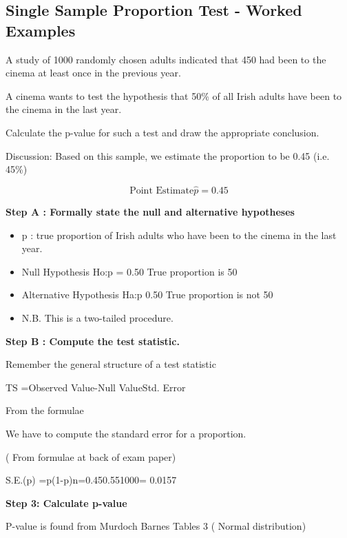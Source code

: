 
\subsection{ Single Sample Proportion Test - Worked Examples}

A study of 1000 randomly chosen adults indicated that 450 had been to the cinema at least once in the previous year.

A cinema wants to test the hypothesis that 50\% of all Irish adults have been to the cinema in the last year.

Calculate the p-value for such a test and draw the appropriate conclusion.

Discussion: Based on this sample, we estimate the proportion to be 0.45  (i.e. 45\%)

\[ \mbox{Point Estimate} \hat{p} = 0.45\]

\noindent \textbf{Step A : Formally state the null and alternative hypotheses}

\begin{itemize}
	\item p : true proportion of Irish adults who have been to the cinema in the last year.
	
	\item	Null Hypothesis               Ho:p = 0.50        True proportion is 50%
	
	\item Alternative Hypothesis      Ha:p 0.50        True proportion is not 50%
	
	
	\item	N.B. This is a two-tailed procedure.
\end{itemize}




\noindent \textbf{Step B : Compute the test statistic.}

Remember the general structure of a test statistic

TS =Observed Value-Null ValueStd. Error 



From the formulae

We have to compute the standard error for a proportion. 

( From formulae at back of exam paper)

S.E.(p) =p(1-p)n=0.450.551000= 0.0157




\noindent \textbf{Step 3: Calculate p-value}

P-value is found from Murdoch Barnes Tables 3 ( Normal distribution)

